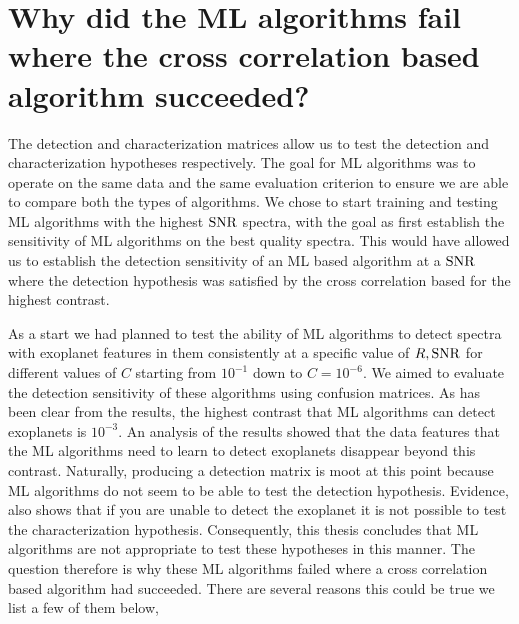 \section{Why did the ML algorithms fail where the cross correlation based algorithm succeeded?}
The detection and characterization matrices allow us to test the detection and characterization hypotheses respectively.
The goal for ML algorithms was to operate on the same data and the same evaluation criterion to ensure we are able to compare both the types of algorithms.
We chose to start training and testing ML algorithms with the highest $\rm{SNR}$ spectra, with the goal as first establish the sensitivity of ML algorithms on the best quality spectra.
This would have allowed us to establish the detection sensitivity of an ML based algorithm at a $\rm{SNR}$ where the detection hypothesis was satisfied by the cross correlation based for the highest contrast.

As a start we had planned to test the ability of ML algorithms to detect spectra with exoplanet features in them consistently at a specific value of $R,\rm{SNR}$ for different values of $C$ starting from $10^{-1}$ down to $C=10^{-6}$.
We aimed to evaluate the detection sensitivity of these algorithms using confusion matrices.
As has been clear from the results, the highest contrast that ML algorithms can detect exoplanets is $10^{-3}$.
An analysis of the results showed that the data features that the ML algorithms need to learn to detect exoplanets disappear beyond this contrast.
Naturally, producing a detection matrix is moot at this point because ML algorithms do not seem to be able to test the detection hypothesis. 
Evidence, also shows that if you are unable to detect the exoplanet it is not possible to test the characterization hypothesis.
Consequently, this thesis concludes that ML algorithms are not appropriate to test these hypotheses in this manner.
The question therefore is why these ML algorithms failed where a cross correlation based algorithm had succeeded.
There are several reasons this could be true we list a few of them below,
